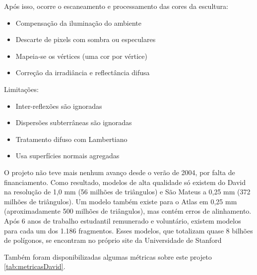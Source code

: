 Após isso, ocorre o escaneamento e processamento das cores da escultura:

\begin{itemize}
\item{Compensação da iluminação do ambiente}
\item{Descarte de pixels com sombra ou especulares}
\item{Mapeia-se os vértices (uma cor por vértice)}
\item{Correção da irradiância e reflectância difusa}
\end{itemize}

Limitações:
\begin{itemize}
\item{Inter-reflexões são ignoradas}
\item{Dispersões subterrâneas são ignoradas}
\item{Tratamento difuso com Lambertiano} %
\item{Usa superfícies normais agregadas}
\end{itemize}

O projeto não teve mais nenhum avanço desde o verão de 2004, por falta de financiamento. Como resultado, modelos de alta qualidade só existem do David na resolução de 1,0 mm (56 milhões de triângulos) e São Mateus a 0,25 mm (372 milhões de triângulos). Um modelo também existe para o Atlas em 0,25 mm (aproximadamente 500 milhões de triângulos), mas contém erros de alinhamento. Após 6 anos de trabalho estudantil remunerado e voluntário, existem modelos para cada um dos 1.186 fragmentos. Esses modelos, que totalizam quase 8 bilhões de polígonos, se encontram no próprio site da Universidade de Stanford %

Também foram disponibilizadas algumas métricas sobre este projeto \ref{tab:metricasDavid}.

